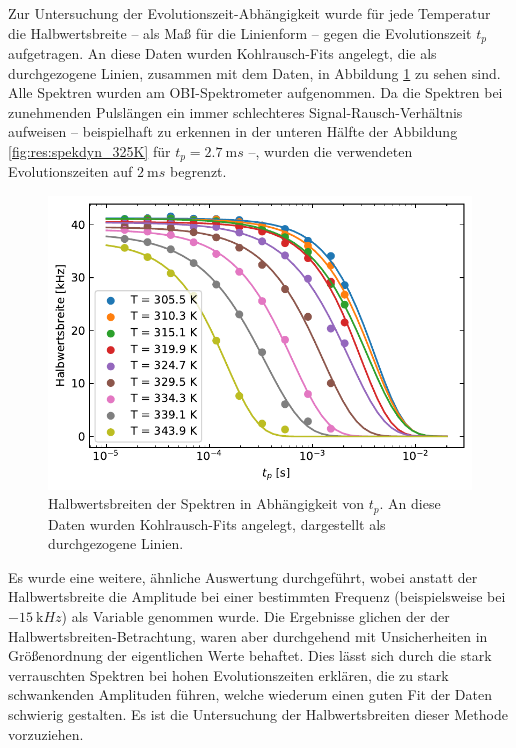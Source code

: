 Zur Untersuchung der Evo\-lu\-tions\-zeit-Ab\-häng\-ig\-keit wurde für jede Temperatur die Halbwertsbreite -- als Maß für die Linienform -- gegen die Evolutionszeit $t_p$ aufgetragen. An diese Daten wurden Kohlrausch-Fits angelegt, die als durchgezogene Linien, zusammen mit dem Daten, in Abbildung \ref{fig:res:spekdyn_fits} zu sehen sind. Alle Spektren wurden am OBI-Spektrometer aufgenommen. Da die Spektren bei zunehmenden Pulslängen ein immer schlechteres Sig\-nal-Rausch-Ver\-hält\-nis aufweisen -- beispielhaft zu erkennen in der unteren Hälfte der Abbildung \ref{fig:res:spekdyn_325K} für $t_p = \SI{2.7}{\milli s}$ --, wurden die verwendeten Evolutionszeiten auf $\SI{2}{\milli s}$ begrenzt. 
\begin{figure}
	\begin{center}
		\includegraphics[width=.9\textwidth]{graphics/plot/spekdyn_fits2.pdf}
	\end{center}
	\caption{Halbwertsbreiten der Spektren in Abhängigkeit von $t_p$. An diese Daten wurden Kohlrausch-Fits angelegt, dargestellt als durchgezogene Linien.} \label{fig:res:spekdyn_fits}
\end{figure}

Es wurde eine weitere, ähnliche Auswertung durchgeführt, wobei anstatt der Halbwertsbreite die Amplitude bei einer bestimmten Frequenz (beispielsweise bei $\SI{-15}{\kilo Hz}$) als Variable genommen wurde. Die Ergebnisse glichen der der Halbwertsbreiten-Betrachtung, waren aber durchgehend mit Unsicherheiten in Größenordnung der eigentlichen Werte behaftet. Dies lässt sich durch die stark verrauschten Spektren bei hohen Evolutionszeiten erklären, die zu stark schwankenden Amplituden führen, welche wiederum einen guten Fit der Daten schwierig gestalten. Es ist die Untersuchung der Halbwertsbreiten dieser Methode vorzuziehen.



